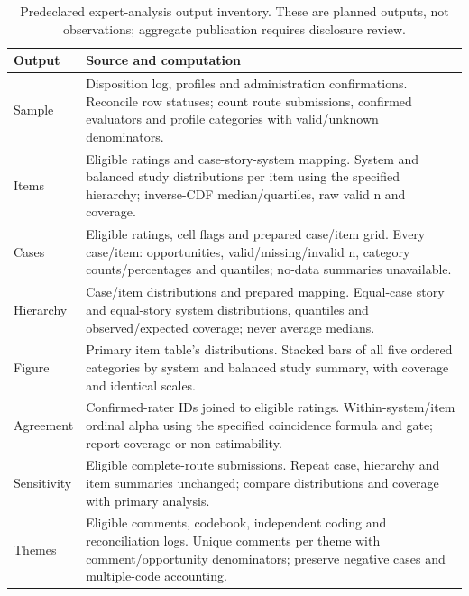 \begin{table}[t]
\caption{Predeclared expert-analysis output inventory. These are planned outputs, not observations; aggregate publication requires disclosure review.}
\label{tab:expert-analysis-outputs}
\centering\small
\begin{tabular}{lp{}}
\hline
\textbf{Output} & \textbf{Source and computation} \\
\hline
Sample & Disposition log, profiles and administration confirmations. Reconcile row statuses; count route submissions, confirmed evaluators and profile categories with valid/unknown denominators. \\
Items & Eligible ratings and case-story-system mapping. System and balanced study distributions per item using the specified hierarchy; inverse-CDF median/quartiles, raw valid n and coverage. \\
Cases & Eligible ratings, cell flags and prepared case/item grid. Every case/item: opportunities, valid/missing/invalid n, category counts/percentages and quantiles; no-data summaries unavailable. \\
Hierarchy & Case/item distributions and prepared mapping. Equal-case story and equal-story system distributions, quantiles and observed/expected coverage; never average medians. \\
Figure & Primary item table's distributions. Stacked bars of all five ordered categories by system and balanced study summary, with coverage and identical scales. \\
Agreement & Confirmed-rater IDs joined to eligible ratings. Within-system/item ordinal alpha using the specified coincidence formula and gate; report coverage or non-estimability. \\
Sensitivity & Eligible complete-route submissions. Repeat case, hierarchy and item summaries unchanged; compare distributions and coverage with primary analysis. \\
Themes & Eligible comments, codebook, independent coding and reconciliation logs. Unique comments per theme with comment/opportunity denominators; preserve negative cases and multiple-code accounting. \\
\hline
\end{tabular}
\end{table}

